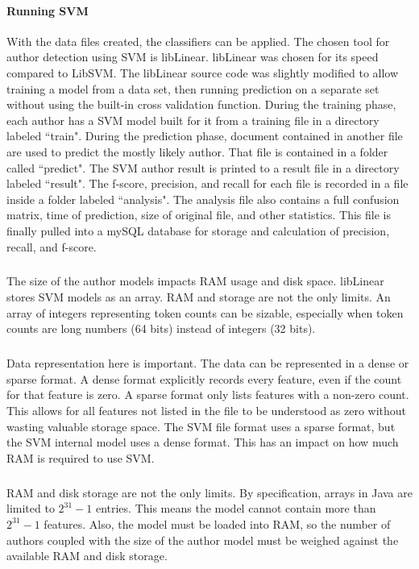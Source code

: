 	\paragraph{Running SVM} With the data files created, the classifiers can be applied. The chosen tool for author detection using SVM is libLinear.  libLinear was chosen for its speed compared to LibSVM.  The libLinear source code was slightly modified to allow training a model from a data set, then running prediction on a separate set without using the built-in cross validation function.  During the training phase, each author has a SVM model built for it from a training file in a directory labeled ``train".  During the prediction phase, document contained in another file are used to predict the mostly likely author.  That file is contained in a folder called ``predict". The SVM author result is printed to a result file in a directory labeled ``result".  The f-score, precision, and recall for each file is recorded in a file inside a folder labeled ``analysis".  The analysis file also contains a full confusion matrix, time of prediction, size of original file, and other statistics.  This file is finally pulled into a mySQL database for storage and calculation of precision, recall, and f-score.
	\subparagraph{} The size of the author models impacts RAM usage and disk space.  libLinear stores SVM models as an array. RAM and storage are not the only limits.  An array of integers representing token counts can be sizable, especially when token counts are long numbers (64 bits) instead of integers (32 bits). 
	\subparagraph{} Data representation here is important.  The data can be represented in a dense or sparse format.  A dense format explicitly records every feature, even if the count for that feature is zero.  A sparse format only lists features with a non-zero count.  This allows for all features not listed in the file to be understood as zero without wasting valuable storage space.  The SVM file format uses a sparse format, but the SVM internal model uses a dense format.  This has an impact on how much RAM is required to use SVM.  
	\subparagraph{} RAM and disk storage are not the only limits. By specification, arrays in Java are limited to $2^{31}-1$ entries.  This means the model cannot contain more than $2^{31}-1$ features.  Also, the model must be loaded into RAM, so the number of authors coupled with the size of the author model must be weighed against the available RAM and disk storage.
	
